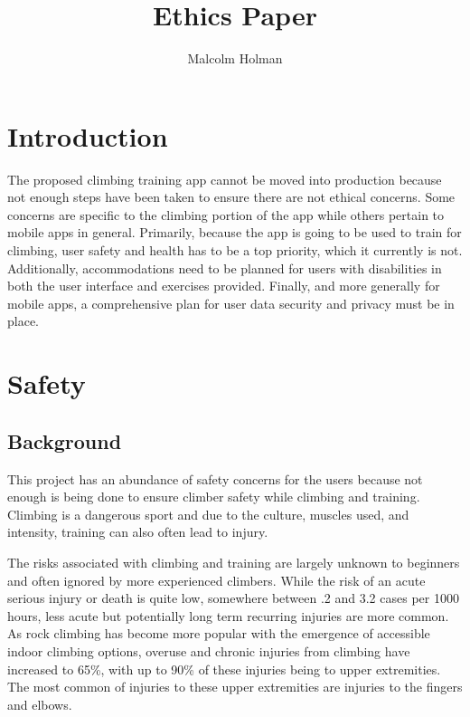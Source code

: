 \documentclass[10pt,twocolumn]{article}
\title{Ethics Paper}
\author{Malcolm Holman}
\affiliation{Occidental College}
\begin{document}
\maketitle

\section{Introduction}

	The proposed climbing training app cannot be moved into production because not enough steps have been taken to ensure there are not ethical concerns. Some concerns are specific to the climbing portion of the app while others pertain to mobile apps in general. Primarily, because the app is going to be used to train for climbing, user safety and health has to be a top priority, which it currently is not. Additionally, accommodations need to be planned for users with disabilities in both the user interface and exercises provided. Finally, and more generally for mobile apps, a comprehensive plan for user data security and privacy must be in place.

	
\section{Safety}

\subsection{Background}

	 This project has an abundance of safety concerns for the users because not enough is being done to ensure climber safety while climbing and training. Climbing is a dangerous sport and due to the culture, muscles used, and intensity, training can also often lead to injury.  
	
	The risks associated with climbing and training are largely unknown to beginners and often ignored by more experienced climbers. While the risk of an acute serious injury or death is quite low, somewhere between .2 and 3.2 cases per 1000 hours, less acute but potentially long term recurring injuries are more common. As rock climbing has become more popular with the emergence of accessible indoor climbing options, overuse and chronic injuries from climbing have increased to 65\%, with up to 90\% of these injuries being to upper extremities. The most common of injuries to these upper extremities are injuries to the fingers and elbows. \cite{meyers_rock_nodate}
\end{document}
